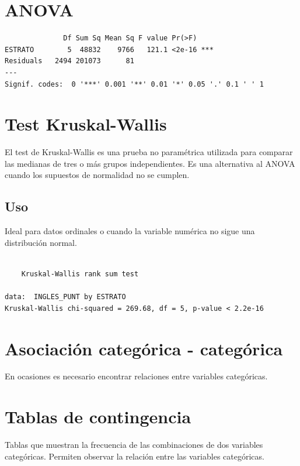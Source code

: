 \documentclass[
  letterpaper,
  DIV=11,
  numbers=noendperiod]{scrreprt}
\begin{document}
\section{ANOVA}\label{anova-1}

\begin{verbatim}
              Df Sum Sq Mean Sq F value Pr(>F)    
ESTRATO        5  48832    9766   121.1 <2e-16 ***
Residuals   2494 201073      81                   
---
Signif. codes:  0 '***' 0.001 '**' 0.01 '*' 0.05 '.' 0.1 ' ' 1
\end{verbatim}

\section{Test Kruskal-Wallis}\label{test-kruskal-wallis}

El test de Kruskal-Wallis es una prueba no paramétrica utilizada para
comparar las medianas de tres o más grupos independientes. Es una
alternativa al ANOVA cuando los supuestos de normalidad no se cumplen.

\subsection{Uso}\label{uso}

Ideal para datos ordinales o cuando la variable numérica no sigue una
distribución normal.

\begin{verbatim}

    Kruskal-Wallis rank sum test

data:  INGLES_PUNT by ESTRATO
Kruskal-Wallis chi-squared = 269.68, df = 5, p-value < 2.2e-16
\end{verbatim}

\section{Asociación categórica -
categórica}\label{asociaciuxf3n-categuxf3rica---categuxf3rica}

En ocasiones es necesario encontrar relaciones entre variables
categóricas.

\section{Tablas de contingencia}\label{tablas-de-contingencia}

Tablas que muestran la frecuencia de las combinaciones de dos variables
categóricas. Permiten observar la relación entre las variables
categóricas.
\end{document}

